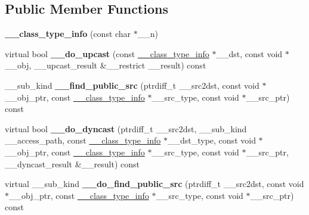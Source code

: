 \subsection*{Public Member Functions}
\begin{DoxyCompactItemize}
\item 
\hypertarget{class____cxxabiv1_1_1____class__type__info_a798832b76c80dbba4c11ac6dd5f3e232}{{\bfseries \+\_\+\+\_\+class\+\_\+type\+\_\+info} (const char $\ast$\+\_\+\+\_\+n)}\label{class____cxxabiv1_1_1____class__type__info_a798832b76c80dbba4c11ac6dd5f3e232}

\item 
\hypertarget{class____cxxabiv1_1_1____class__type__info_aebe067fb290894f8caf1171d4f292eb7}{virtual bool {\bfseries \+\_\+\+\_\+do\+\_\+upcast} (const \hyperlink{class____cxxabiv1_1_1____class__type__info}{\+\_\+\+\_\+class\+\_\+type\+\_\+info} $\ast$\+\_\+\+\_\+dst, const void $\ast$\+\_\+\+\_\+obj, \+\_\+\+\_\+upcast\+\_\+result \&\+\_\+\+\_\+restrict \+\_\+\+\_\+result) const }\label{class____cxxabiv1_1_1____class__type__info_aebe067fb290894f8caf1171d4f292eb7}

\item 
\hypertarget{class____cxxabiv1_1_1____class__type__info_acf4fb33385f1cd53a0d3a3c318fecb91}{\+\_\+\+\_\+sub\+\_\+kind {\bfseries \+\_\+\+\_\+find\+\_\+public\+\_\+src} (ptrdiff\+\_\+t \+\_\+\+\_\+src2dst, const void $\ast$\+\_\+\+\_\+obj\+\_\+ptr, const \hyperlink{class____cxxabiv1_1_1____class__type__info}{\+\_\+\+\_\+class\+\_\+type\+\_\+info} $\ast$\+\_\+\+\_\+src\+\_\+type, const void $\ast$\+\_\+\+\_\+src\+\_\+ptr) const }\label{class____cxxabiv1_1_1____class__type__info_acf4fb33385f1cd53a0d3a3c318fecb91}

\item 
\hypertarget{class____cxxabiv1_1_1____class__type__info_aef2eca26fee69c7c703110f1df3d4231}{virtual bool {\bfseries \+\_\+\+\_\+do\+\_\+dyncast} (ptrdiff\+\_\+t \+\_\+\+\_\+src2dst, \+\_\+\+\_\+sub\+\_\+kind \+\_\+\+\_\+access\+\_\+path, const \hyperlink{class____cxxabiv1_1_1____class__type__info}{\+\_\+\+\_\+class\+\_\+type\+\_\+info} $\ast$\+\_\+\+\_\+dst\+\_\+type, const void $\ast$\+\_\+\+\_\+obj\+\_\+ptr, const \hyperlink{class____cxxabiv1_1_1____class__type__info}{\+\_\+\+\_\+class\+\_\+type\+\_\+info} $\ast$\+\_\+\+\_\+src\+\_\+type, const void $\ast$\+\_\+\+\_\+src\+\_\+ptr, \+\_\+\+\_\+dyncast\+\_\+result \&\+\_\+\+\_\+result) const }\label{class____cxxabiv1_1_1____class__type__info_aef2eca26fee69c7c703110f1df3d4231}

\item 
\hypertarget{class____cxxabiv1_1_1____class__type__info_a55642179dadcb332571f237c622abbc2}{virtual \+\_\+\+\_\+sub\+\_\+kind {\bfseries \+\_\+\+\_\+do\+\_\+find\+\_\+public\+\_\+src} (ptrdiff\+\_\+t \+\_\+\+\_\+src2dst, const void $\ast$\+\_\+\+\_\+obj\+\_\+ptr, const \hyperlink{class____cxxabiv1_1_1____class__type__info}{\+\_\+\+\_\+class\+\_\+type\+\_\+info} $\ast$\+\_\+\+\_\+src\+\_\+type, const void $\ast$\+\_\+\+\_\+src\+\_\+ptr) const }\label{class____cxxabiv1_1_1____class__type__info_a55642179dadcb332571f237c622abbc2}

\end{DoxyCompactItemize}
